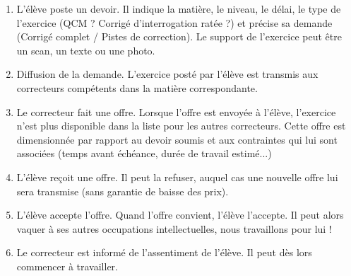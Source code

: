 \begin{enumerate}
\item L’élève poste un devoir. Il indique la matière, le niveau, le délai, le type de l’exercice (QCM ? Corrigé d’interrogation ratée ?) et précise sa demande (Corrigé complet / Pistes de correction). Le support de l’exercice peut être un scan, un texte ou une photo.
\item Diffusion de la demande. L’exercice posté par l’élève est transmis aux correcteurs compétents dans la matière correspondante.
\item Le correcteur fait une offre.  Lorsque l’offre est envoyée à l’élève, l’exercice n’est plus disponible dans la liste pour les autres correcteurs. Cette offre est dimensionnée par rapport au devoir soumis et aux contraintes qui lui sont associées (temps avant échéance, durée de travail estimé...)
\item L’élève reçoit une offre. Il peut la refuser, auquel cas une nouvelle offre lui sera transmise (sans garantie de baisse des prix).
\item L’élève accepte l’offre. Quand l’offre convient, l’élève l’accepte. Il peut alors vaquer à ses autres occupations intellectuelles, nous travaillons pour lui !
\item Le correcteur est informé de l’assentiment de l’élève. Il peut dès lors commencer à travailler.
\end{enumerate}